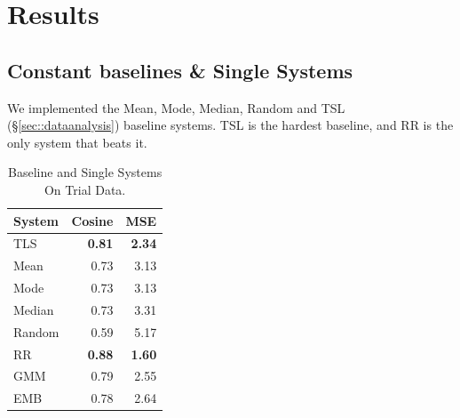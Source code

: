 \documentclass[11pt,letterpaper]{article}
\begin{document}
\section{Results}

\subsection{Constant baselines \& Single Systems}\label{sec:baselineResults}
We implemented the Mean, Mode, Median, Random and TSL (\S\ref{sec::dataanalysis}) baseline systems. TSL is the hardest baseline, and {\sc RR} is the only system that beats it.

\begin{table}[!ht]
\begin{center}
\begin{tabular}{|l|r|r|}
\hline
System & Cosine & MSE\\
\hline
TLS & {\bf 0.81} & {\bf 2.34}\\
Mean & 0.73 & 3.13\\
Mode & 0.73 & 3.13\\
Median & 0.73 & 3.31\\
Random & 0.59  & 5.17\\
\hline
{\sc RR} & {\bf 0.88} & {\bf 1.60}\\
GMM & 0.79  & 2.55\\
EMB & 0.78 & 2.64\\
\hline
\end{tabular}
\end{center}
\caption{Baseline and Single Systems On Trial Data.}
\label{tbl:baselines}
\end{table}




\end{document}
